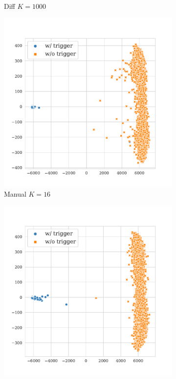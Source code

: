 \begin{figure}[!ht]
\begin{subfigure}{.33\textwidth}
  \caption{Diff $K = 1000$}
  \label{fig:sst2_diff_k1000_embed}
\end{subfigure}
\begin{subfigure}{.33\textwidth}
  \centering
  \includegraphics[width=\linewidth]{figures/evaluation_media/sst2-roberta-large-visual-backdoor-manual-prompt-k16-seed42-poison-cf-1045.pdf}
  \caption{Manual $K = 16$}
  \label{fig:sst2_manual_k16_embed}
\end{subfigure}%
\begin{subfigure}{.33\textwidth}
  \centering
  \includegraphics[width=\linewidth]{figures/evaluation_media/sst2-roberta-large-visual-backdoor-manual-prompt-k100-seed42-poison-cf-1045.pdf}

\end{subfigure}
\end{figure}
